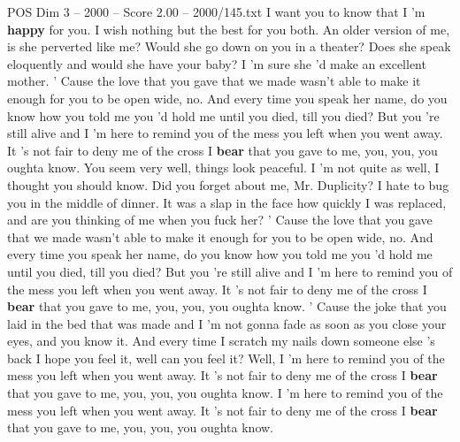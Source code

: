 \begin{textsample}{POS Dim 3 – 2000 – Score 2.00 – 2000/145.txt}  \label{ex:f3_pos_031}
I want you to know that I 'm \textbf{happy} for you.
I wish nothing but the best for you both.
An older version of me, is she perverted like me?
Would she go down on you in a theater?
Does she speak eloquently and would she have your baby?
I 'm sure she 'd make an excellent mother. ' Cause the love that you gave that we made wasn't able to make it enough for you to be open wide, no.
And every time you speak her name, do you know how you told me you 'd hold me until you died, till you died?
But you 're still alive and I 'm here to remind you of the mess you left when you went away.
It 's not fair to deny me of the cross I \textbf{bear} that you gave to me, you, you, you oughta know.
You seem very well, things look peaceful.
I 'm not quite as well, I thought you should know.
Did you forget about me, Mr.
Duplicity?
I hate to bug you in the middle of dinner.
It was a slap in the face how quickly I was replaced, and are you thinking of me when you fuck her? ' Cause the love that you gave that we made wasn't able to make it enough for you to be open wide, no.
And every time you speak her name, do you know how you told me you 'd hold me until you died, till you died?
But you 're still alive and I 'm here to remind you of the mess you left when you went away.
It 's not fair to deny me of the cross I \textbf{bear} that you gave to me, you, you, you oughta know. ' Cause the joke that you laid in the bed that was made and I 'm not gonna fade as soon as you close your eyes, and you know it.
And every time I scratch my nails down someone else 's back I hope you feel it, well can you feel it?
Well, I 'm here to remind you of the mess you left when you went away.
It 's not fair to deny me of the cross I \textbf{bear} that you gave to me, you, you, you oughta know.
I 'm here to remind you of the mess you left when you went away.
It 's not fair to deny me of the cross I \textbf{bear} that you gave to me, you, you, you oughta know.

\end{textsample}

